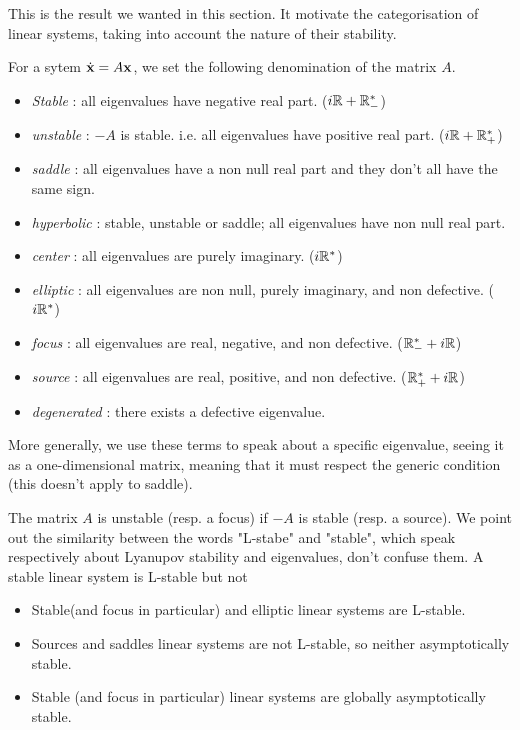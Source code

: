 This is the result we wanted in this section. It motivate the categorisation of linear systems, taking into account the nature of their stability.
\begin{definition}
    For a sytem $\dot{\mathbf{x}}=A\mathbf{x}$, we set the following denomination of the matrix $A$.
    \begin{itemize}
    \item \emph{Stable} : all eigenvalues have negative real part. ($i\mathbb{R}+\mathbb{R}^*_-$)
    \item \emph{unstable} : $-A$ is stable. i.e. all eigenvalues have positive real part. ($i\mathbb{R}+\mathbb{R}^*_+$)
    \item \emph{saddle} : all eigenvalues have a non null real part and they don't all have the same sign.
    \item \emph{hyperbolic} : stable, unstable or saddle; \ie all eigenvalues have non null real part.
    \item \emph{center} : all eigenvalues are purely imaginary. ($i\mathbb{R}^*$)
    \item \emph{elliptic} : all eigenvalues are non null, purely imaginary, and non defective. ($i\mathbb{R}^*$)
    \item \emph{focus} : all eigenvalues are real, negative, and non defective. ($\mathbb{R}^*_-+i\mathbb{R}$)
    \item \emph{source} : all eigenvalues are real, positive, and non defective. ($\mathbb{R}^*_++i\mathbb{R}$)
    \item \emph{degenerated} : there exists a defective eigenvalue.
    \end{itemize}
    More generally, we use these terms to speak about a specific eigenvalue, seeing it as a one-dimensional matrix, meaning that it must respect the generic condition (this doesn't apply to saddle).
\end{definition}
\begin{remarque}
    The matrix $A$ is unstable (resp. a focus) if $-A$ is stable (resp. a source).
    We point out the similarity between the words "L-stabe" and "stable", which speak respectively about Lyanupov stability and eigenvalues, don't confuse them. A stable linear system is L-stable but not 
\end{remarque}
\begin{corollaire}
\quad
\begin{itemize} 
    \item Stable(and focus in particular) and elliptic linear systems are L-stable.
    \item Sources and saddles linear systems are not L-stable, so  neither asymptotically stable.
    \item Stable (and focus in particular) linear systems are globally asymptotically stable.
    \end{itemize} 
\end{corollaire}

